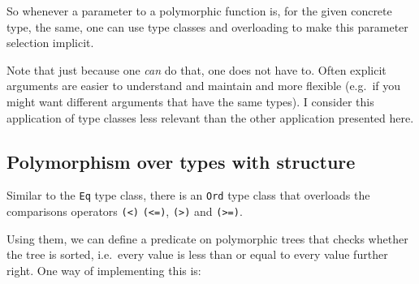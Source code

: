 \documentclass[11pt,
  american,
  DIV13]{article}
\newenvironment{Shaded}{}{}
\newcommand{\DataTypeTok}[1]{\textcolor[rgb]{0.56,0.13,0.00}{#1}}
\newcommand{\NormalTok}[1]{#1}
\newcommand{\OperatorTok}[1]{\textcolor[rgb]{0.40,0.40,0.40}{#1}}
\newcommand{\OtherTok}[1]{\textcolor[rgb]{0.00,0.44,0.13}{#1}}
\begin{document}
So whenever a parameter to a polymorphic function is, for the given
concrete type, the same, one can use type classes and overloading to
make this parameter selection implicit.

Note that just because one \emph{can} do that, one does not have to.
Often explicit arguments are easier to understand and maintain and more
flexible (e.g.~if you might want different arguments that have the same
types). I consider this application of type classes less relevant than
the other application presented here.

\hypertarget{polymorphism-over-types-with-structure}{%
\subsection{Polymorphism over types with
structure}\label{polymorphism-over-types-with-structure}}

Similar to the \texttt{Eq} type class, there is an \texttt{Ord} type
class that overloads the comparisons operators \texttt{(\textless{})}
\texttt{(\textless{}=)}, \texttt{(\textgreater{})} and
\texttt{(\textgreater{}=)}.

Using them, we can define a predicate on polymorphic trees that checks
whether the tree is sorted, i.e.~every value is less than or equal to
every value further right. One way of implementing this is:

\begin{Shaded}
\end{Shaded}
\end{document}
